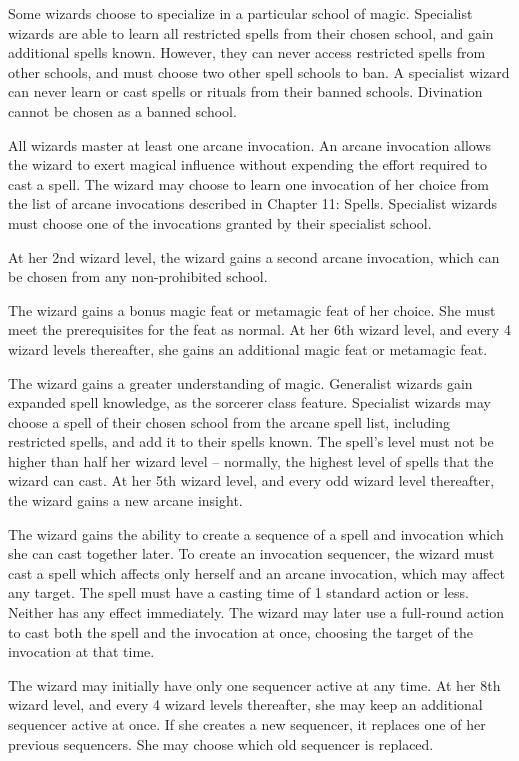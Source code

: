 Some wizards choose to specialize in a particular school of magic.
Specialist wizards are able to learn all restricted spells from their chosen school, and gain additional spells known.
However, they can never access restricted spells from other schools, and must choose two other spell schools to ban.
A specialist wizard can never learn or cast spells or rituals from their banned schools.
Divination cannot be chosen as a banned school.

All wizards master at least one arcane invocation.
An arcane invocation allows the wizard to exert magical influence without expending the effort required to cast a spell.
The wizard may choose to learn one invocation of her choice from the list of arcane invocations described in Chapter 11: Spells.
Specialist wizards must choose one of the invocations granted by their specialist school.

At her 2nd wizard level, the wizard gains a second arcane invocation, which can be chosen from any non-prohibited school.

The wizard gains a bonus magic feat or metamagic feat of her choice.
She must meet the prerequisites for the feat as normal.
At her 6th wizard level, and every 4 wizard levels thereafter, she gains an additional magic feat or metamagic feat.

The wizard gains a greater understanding of magic.
Generalist wizards gain expanded spell knowledge, as the sorcerer class feature.
Specialist wizards may choose a spell of their chosen school from the arcane spell list, including restricted spells, and add it to their spells known.
The spell's level must not be higher than half her wizard level -- normally, the highest level of spells that the wizard can cast.
At her 5th wizard level, and every odd wizard level thereafter, the wizard gains a new arcane insight.

The wizard gains the ability to create a sequence of a spell and invocation which she can cast together later.
To create an invocation sequencer, the wizard must cast a spell which affects only herself and an arcane invocation, which may affect any target.
The spell must have a casting time of 1 standard action or less.
Neither has any effect immediately.
The wizard may later use a full-round action to cast both the spell and the invocation at once, choosing the target of the invocation at that time.
\par The wizard may initially have only one sequencer active at any time.
At her 8th wizard level, and every 4 wizard levels thereafter, she may keep an additional sequencer active at once.
If she creates a new sequencer, it replaces one of her previous sequencers.
She may choose which old sequencer is replaced.


